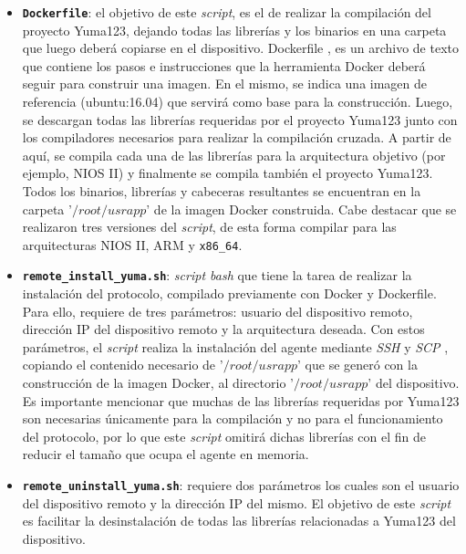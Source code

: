   \begin{itemize}
	\item \textbf{\texttt{Dockerfile}}: el objetivo de este \textit{script}, es el de realizar la compilación del proyecto Yuma123, dejando todas las librerías y los binarios en una carpeta que luego deberá copiarse en el dispositivo. Dockerfile \parencite{dockerfile}, es un archivo de texto que contiene los pasos e instrucciones que la herramienta Docker deberá seguir para construir una imagen. En el mismo, se indica una imagen de referencia (ubuntu:16.04) que servirá como base para la construcción. Luego, se descargan todas las librerías requeridas por el proyecto Yuma123 junto con los compiladores necesarios para realizar la compilación cruzada. A partir de aquí, se compila cada una de las librerías para la arquitectura objetivo (por ejemplo, NIOS II) y finalmente se compila también el proyecto Yuma123. Todos los binarios, librerías y cabeceras resultantes se encuentran en la carpeta '$/root/usrapp$' de la imagen Docker construida. Cabe destacar que se realizaron tres versiones del \textit{script}, de esta forma compilar para las arquitecturas NIOS II, ARM y \texttt{x86\_64}.
    
    \item \textbf{\texttt{remote\_install\_yuma.sh}}: \textit{script bash} que tiene la tarea de realizar la instalación del protocolo, compilado previamente con Docker y Dockerfile. Para ello, requiere de tres parámetros: usuario del dispositivo remoto, dirección IP del dispositivo remoto y la arquitectura deseada. Con estos parámetros, el \textit{script} realiza la instalación del agente mediante \textit{SSH} y \textit{SCP} \parencite{scpman}, copiando el contenido necesario de '$/root/usrapp$' que se generó con la construcción de la imagen Docker, al directorio '$/root/usrapp$' del dispositivo. Es importante mencionar que muchas de las librerías requeridas por Yuma123 son necesarias únicamente para la compilación y no para el funcionamiento del protocolo, por lo que este \textit{script} omitirá dichas librerías con el fin de reducir el tamaño que ocupa el agente en memoria.
    
    \item \textbf{\texttt{remote\_uninstall\_yuma.sh}}: requiere dos parámetros los cuales son el usuario del dispositivo remoto y la dirección IP del mismo. El objetivo de este \textit{script} es facilitar la desinstalación de todas las librerías relacionadas a Yuma123 del dispositivo.

\end{itemize}


